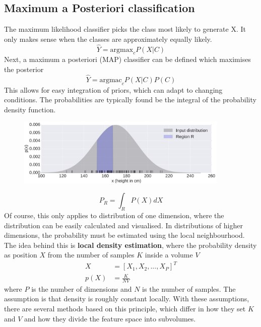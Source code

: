 \documentclass[CS5104-Notes.tex]{subfiles}
\begin{document}
\subsection{Maximum a Posteriori classification}
The maximum likelihood classifier picks the class most likely to generate X. It only makes sense when the classes are approximately equally likely.
\begin{equation}
\hat{Y} = \text{argmax}_{c}P(X|C)
\end{equation}
Next, a maximum a posteriori (MAP) classifier can be defined which maximises the posterior
\begin{equation}
\hat{Y} = \text{argmac}_{c}P(X|C)P(C)
\end{equation}
This allows for easy integration of priors, which can adapt to changing conditions. The probabilities are typically found be the integral of the probability density function.
\begin{figure}[H]
  \centering
  \includegraphics[width=0.9\textwidth, keepaspectratio]{imgs/height-distribution.png}
\end{figure}
\noindent
\begin{equation}
P_{R} = \int_{R}P(X)dX
\end{equation}
Of course, this only applies to distribution of one dimension, where the distribution can be easily calculated and visualised. In distributions of higher dimensions, the probability must be estimated using the local neighbourhood. The idea behind this is \textbf{local density estimation}, where the probability density as position $X$ from the number of samples  $K$ inside a volume $V$
\begin{align}
  X &= [X_{1}, X_{2}, ..., X_{P}]^{T} \\
  p(X) &= \frac{K}{NV}
\end{align}
where $P$ is the number of dimensions and $N$ is the number of samples. The assumption is that density is roughly constant locally. With these assumptions, there are several methods based on this principle, which differ in how they set $K$ and $V$ and how they divide the feature space into subvolumes. 
\end{document}
